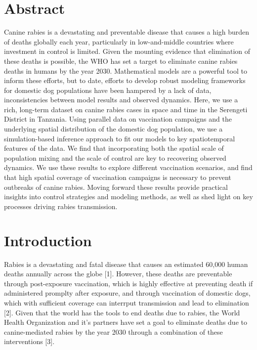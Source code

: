 \documentclass[
]{book}
\begin{document}
\hypertarget{abstract-3}{%
\section*{Abstract}\label{abstract-3}}

Canine rabies is a devastating and preventable disease that causes a high burden of deaths globally each year, particularly in low-and-middle countries where investment in control is limited. Given the mounting evidence that elimination of these deaths is possible, the WHO has set a target to eliminate canine rabies deaths in humans by the year 2030. Mathematical models are a powerful tool to inform these efforts, but to date, efforts to develop robust modeling frameworks for domestic dog populations have been hampered by a lack of data, inconsistencies between model results and observed dynamics. Here, we use a rich, long-term dataset on canine rabies cases in space and time in the Serengeti District in Tanzania. Using parallel data on vaccination campaigns and the underlying spatial distribution of the domestic dog population, we use a simulation-based inference approach to fit our models to key spatiotemporal features of the data. We find that incorporating both the spatial scale of population mixing and the scale of control are key to recovering observed dynamics. We use these results to explore different vaccination scenarios, and find that high spatial coverage of vaccination campaigns is necessary to prevent outbreaks of canine rabies. Moving forward these results provide practical insights into control strategies and modeling methods, as well as shed light on key processes driving rabies transmission.

\hypertarget{introduction-4}{%
\section{Introduction}\label{introduction-4}}

Rabies is a devastating and fatal disease that causes an estimated 60,000 human deaths annually across the globe {[}1{]}. However, these deaths are preventable through post-exposure vaccination, which is highly effective at preventing death if administered promplty after exposure, and through vaccination of domestic dogs, which with sufficient coverage can interrput transmission and lead to elimination {[}2{]}. Given that the world has the tools to end deaths due to rabies, the World Health Organization and it's partners have set a goal to eliminate deaths due to canine-mediated rabies by the year 2030 through a combination of these interventions {[}3{]}.
\end{document}
